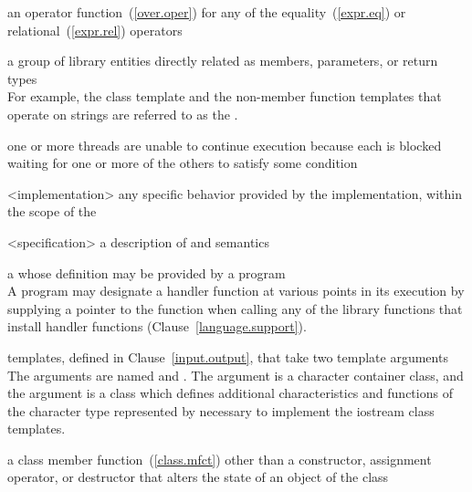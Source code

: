 %
an operator function~(\ref{over.oper}) for any of the equality~(\ref{expr.eq}) or
relational~(\ref{expr.rel}) operators

%
a group of library entities directly related as members, parameters, or
return types\\
\enternote
For example, the class template
and the non-member
function templates
that operate on
strings are referred to as the
.
\exitnote

%
one or more threads are unable to continue execution because each is
blocked waiting for one or more of the others to satisfy some condition

%
<implementation>
any specific behavior provided by the implementation,
within the scope of the

%
<specification>
a description of
and
semantics

%
a
whose definition may be provided by a \Cpp program\\
\enternote
A \Cpp program may designate a handler function at various points in its execution by
supplying a pointer to the function when calling any of the library functions that install
handler functions (Clause~\ref{language.support}).
\exitnote

templates, defined in Clause~\ref{input.output},
that take two template arguments\\
\enternote
The arguments are named
and
.
The argument
is a character container class,
and the argument
is a class which defines additional characteristics and functions
of the character type represented by
necessary to implement the iostream class templates.
\exitnote

%
a class member function~(\ref{class.mfct}) other than a constructor,
assignment operator, or destructor
that alters the state of an object of the class

